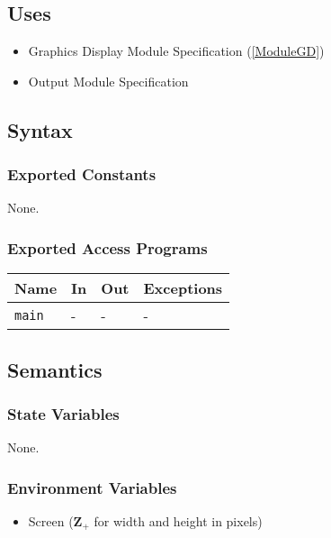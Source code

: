 \documentclass[12pt, titlepage]{article}
\def\code#1{\texttt{#1}}
\begin{document}
\subsection{Uses}

\begin{itemize}
  \item Graphics Display Module Specification (\ref{ModuleGD})
  \item Output Module Specification
\end{itemize}

\subsection{Syntax}

\subsubsection{Exported Constants}

None.

\subsubsection{Exported Access Programs}

\begin{center}
\begin{tabular}{p{2cm} p{4cm} p{4cm} p{2cm}}
\hline
\textbf{Name} & \textbf{In} & \textbf{Out} & \textbf{Exceptions} \\
\hline
\code{main} & - & - & - \\
\hline
\end{tabular}
\end{center}

\subsection{Semantics}

\subsubsection{State Variables}

None.

\subsubsection{Environment Variables}

\begin{itemize}
  \item Screen ($\mathbf{Z}_{+}$ for width and height in pixels)
\end{itemize}
\end{document}
